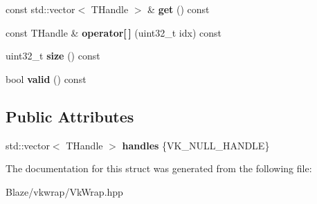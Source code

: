 \begin{DoxyCompactItemize}
const std\+::vector$<$ T\+Handle $>$ \& {\bfseries get} () const
\item 
\mbox{\label{structblaze_1_1vkw_1_1BaseCollection_a74a1ddfb8a111dff8981431cf3216d05}} 
const T\+Handle \& {\bfseries operator\mbox{[}$\,$\mbox{]}} (uint32\+\_\+t idx) const
\item 
\mbox{\label{structblaze_1_1vkw_1_1BaseCollection_ad63cf042127fc30a8202559d555de9b5}} 
uint32\+\_\+t {\bfseries size} () const
\item 
\mbox{\label{structblaze_1_1vkw_1_1BaseCollection_a3a36a4c14a6349f07b7f33e60ee75420}} 
bool {\bfseries valid} () const
\end{DoxyCompactItemize}
\subsection*{Public Attributes}
\begin{DoxyCompactItemize}
\item 
\mbox{\label{structblaze_1_1vkw_1_1BaseCollection_a61cf8a586a37cb6353932bb4301576cb}} 
std\+::vector$<$ T\+Handle $>$ {\bfseries handles} \{V\+K\+\_\+\+N\+U\+L\+L\+\_\+\+H\+A\+N\+D\+LE\}
\end{DoxyCompactItemize}


The documentation for this struct was generated from the following file\+:\begin{DoxyCompactItemize}
\item 
Blaze/vkwrap/Vk\+Wrap.\+hpp\end{DoxyCompactItemize}
